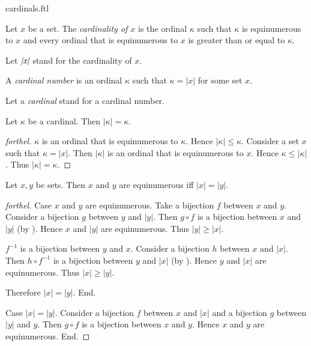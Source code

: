 \documentclass{naproche-library}
\begin{document}
\begin{smodule}[title=Cardinal Numbers]{cardinals.ftl}

\begin{definition}[forthel,id=SET_THEORY_06_8286266038681600]
  Let $x$ be a set.
  The \emph{cardinality of $x$} is the ordinal $\kappa$ such that $\kappa$ is equinumerous to $x$ and every ordinal that is equinumerous to $x$ is greater than or equal to $\kappa$.

  Let $\emph{|x|}$ stand for the cardinality of $x$.
\end{definition}

\begin{definition}[forthel,id=SET_THEORY_06_6818986081648640]
  A \emph{cardinal number} is an ordinal $\kappa$ such that $\kappa = |x|$ for some
  set $x$.

  Let a \emph{cardinal} stand for a cardinal number.
\end{definition}

\begin{proposition}[forthel,id=SET_THEORY_06_2820082336006144]
  Let $\kappa$ be a cardinal.
  Then $|\kappa| = \kappa$.
\end{proposition}
\begin{proof}[forthel]
  $\kappa$ is an ordinal that is equinumerous to $\kappa$.
  Hence $|\kappa| \leq \kappa$.
  Consider a set $x$ such that $\kappa = |x|$.
  Then $|\kappa|$ is an ordinal that is equinumerous to $x$.
  Hence $\kappa \leq |\kappa|$.
  Thus $|\kappa| = \kappa$.
\end{proof}

\begin{proposition}[forthel,id=SET_THEORY_06_6920913721229312]
  Let $x, y$ be sets.
  Then $x$ and $y$ are equinumerous iff $|x| = |y|$.
\end{proposition}
\begin{proof}[forthel]
  Case $x$ and $y$ are equinumerous.
    Take a bijection $f$ between $x$ and $y$.
    Consider a bijection $g$ between $y$ and $|y|$.
    Then $g \circ f$ is a bijection between $x$ and $|y|$ (by ).
    Hence $x$ and $|y|$ are equinumerous.
    Thus $|y| \geq |x|$.

    $f^{-1}$ is a bijection between $y$ and $x$.
    Consider a bijection $h$ between $x$ and $|x|$.
    Then $h \circ f^{-1}$ is a bijection between $y$ and $|x|$ (by ).
    Hence $y$ and $|x|$ are equinumerous.
    Thus $|x| \geq |y|$.

    Therefore $|x| = |y|$.
  End.

  Case $|x| = |y|$.
    Consider a bijection $f$ between $x$ and $|x|$ and a bijection $g$
    between $|y|$ and $y$.
    Then $g \circ f$ is a bijection between $x$ and $y$.
    Hence $x$ and $y$ are equinumerous.
  End.
\end{proof}
\end{smodule}
\end{document}
